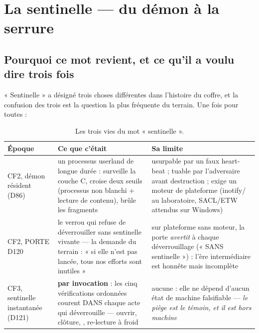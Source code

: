 \section{La sentinelle — du démon à la serrure}\label{sec:sentinelle}

\subsection{Pourquoi ce mot revient, et ce qu'il a voulu dire trois fois}

« Sentinelle » a désigné trois choses différentes dans l'histoire du coffre, et la
confusion des trois est la question la plus fréquente du terrain. Une fois pour
toutes :

\begin{table}[htbp]
\centering\small
\caption{Les trois vies du mot « sentinelle ».}
\label{tab:sentinelles}
\begin{tabularx}{\textwidth}{@{}l Y Y@{}}
\toprule
\textbf{Époque} & \textbf{Ce que c'était} & \textbf{Sa limite} \\
\midrule
CF2, démon résident (D86) & un processus userland de longue durée : surveille la
couche C, croise deux seuils (processus non blanchi + lecture de contenu), brûle les
fragments & usurpable par un faux heart-beat ; tuable par l'adversaire avant
destruction ; exige un moteur de plateforme (inotify/ au laboratoire,
SACL/ETW attendus sur Windows) \\
CF2, PORTE D120 & le verrou qui refuse de déverrouiller sans sentinelle vivante — la
demande du terrain : « si elle n'est pas lancée, tous nos efforts sont inutiles » &
sur plateforme sans moteur, la porte \emph{avertit} à chaque déverrouillage (« SANS
sentinelle ») : l'ère intermédiaire est honnête mais incomplète \\
CF3, sentinelle instantanée (D121) & \textbf{par invocation} : les cinq vérifications
ordonnées courent DANS chaque acte qui déverrouille — ouvrir, clôture,
, re-lecture à froid & aucune : elle ne dépend d'aucun état de machine
falsifiable — \emph{le piège est le témoin, et il est hors machine} \\
\bottomrule
\end{tabularx}
\end{table}

